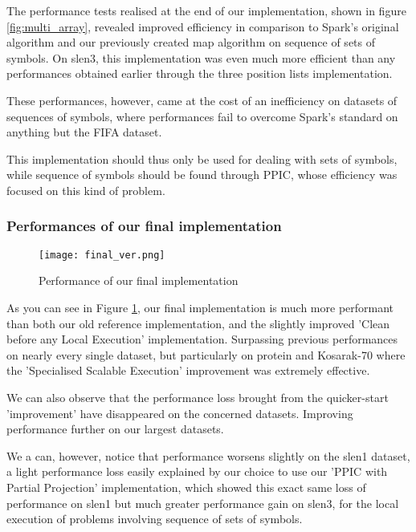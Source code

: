 \documentclass{eplmastersthesis}
\begin{document}
The performance tests realised at the end of our implementation, shown in figure \ref{fig:multi_array}, revealed improved efficiency in comparison to Spark's original algorithm and our previously created map algorithm on sequence of sets of symbols. On slen3, this implementation was even much more efficient than any performances obtained earlier through the three position lists implementation. \newline

These performances, however, came at the cost of an inefficiency on datasets of sequences of symbols, where performances fail to overcome Spark's standard on anything but the FIFA dataset. \newline

This implementation should thus only be used for dealing with sets of symbols, while sequence of symbols should be found through PPIC, whose efficiency was focused on this kind of problem.

\subsubsection{Performances of our final implementation}

\begin{figure}[h]
  \centering
  \texttt{[image: final\_ver.png]}
  \caption{Performance of our final implementation}
  \label{fig:final_ver}
\end{figure}

As you can see in Figure \ref{fig:final_ver}, our final implementation is much more performant than both our old reference implementation, and the slightly improved 'Clean before any Local Execution' implementation. Surpassing previous performances on nearly every single dataset, but particularly on protein and Kosarak-70 where the 'Specialised Scalable Execution' improvement was extremely effective. \newline

We can also observe that the performance loss brought from the quicker-start 'improvement' have disappeared on the concerned datasets. Improving performance further on our largest datasets. \newline

We a can, however, notice that performance worsens slightly on the slen1 dataset, a light performance loss easily explained by our choice to use our 'PPIC with Partial Projection' implementation, which showed this exact same loss of performance on slen1 but much greater performance gain on slen3, for the local execution of problems involving sequence of sets of symbols. \newline
\end{document}
